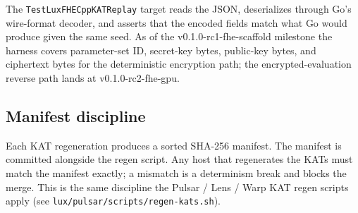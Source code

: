 The \texttt{TestLuxFHECppKATReplay} target reads the JSON, deserializes
through Go's wire-format decoder, and asserts that the encoded fields
match what Go would produce given the same seed. As of the
v0.1.0-rc1-fhe-scaffold milestone the harness covers parameter-set ID,
secret-key bytes, public-key bytes, and ciphertext bytes for the
deterministic encryption path; the encrypted-evaluation reverse path
lands at v0.1.0-rc2-fhe-gpu.

\subsection{Manifest discipline}

Each KAT regeneration produces a sorted SHA-256 manifest. The manifest
is committed alongside the regen script. Any host that regenerates the
KATs must match the manifest exactly; a mismatch is a determinism
break and blocks the merge. This is the same discipline the Pulsar /
Lens / Warp KAT regen scripts apply (see
\texttt{lux/pulsar/scripts/regen-kats.sh}).
